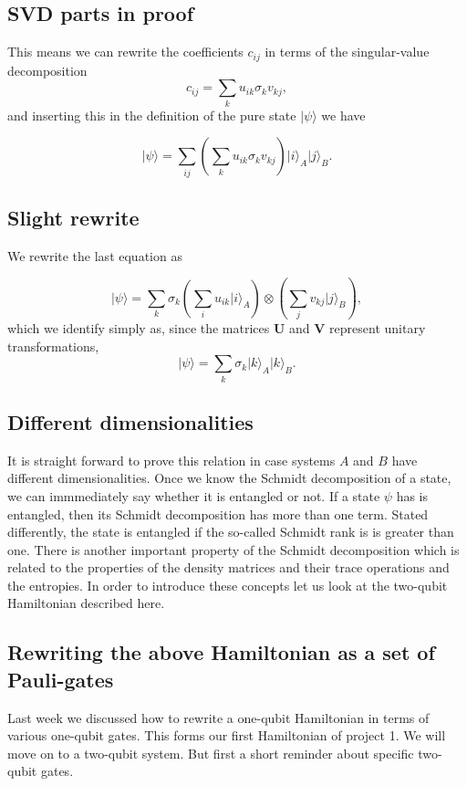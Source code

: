 \documentclass[%
oneside,                 %
final,                   %
10pt]{article}
\begin{document}
\subsection{SVD parts in proof}

This means we can rewrite the coefficients $c_{ij}$ in terms of the singular-value decomposition
\[
c_{ij}=\sum_k u_{ik}\sigma_kv_{kj},
\]
and inserting this in the definition of the pure state $\vert \psi\rangle$ we have

\[
\vert\psi \rangle = \sum_{ij} \left(\sum_k u_{ik}\sigma_kv_{kj} \right)\vert i\rangle_A\vert j\rangle_B.
\]

\subsection{Slight rewrite}
We rewrite the last equation as

\[
\vert\psi \rangle = \sum_{k}\sigma_k \left(\sum_i u_{ik}\vert i\rangle_A\right)\otimes\left(\sum_jv_{kj}\vert j\rangle_B\right),
\]
which we identify simply as, since the matrices $\bm{U}$ and $\bm{V}$ represent unitary transformations,
\[
\vert\psi \rangle = \sum_{k}\sigma_k \vert k\rangle_A\vert k\rangle_B.
\]

\subsection{Different dimensionalities}

It is straight forward to prove this relation in case systems $A$ and
$B$ have different dimensionalities.  Once we know the Schmidt
decomposition of a state, we can immmediately say whether it is
entangled or not. If a state $\psi$ has is entangled, then its Schmidt
decomposition has more than one term. Stated differently, the state is
entangled if the so-called Schmidt rank is is greater than one.  There
is another important property of the Schmidt decomposition which is
related to the properties of the density matrices and their trace
operations and the entropies. In order to introduce these concepts let
us look at the two-qubit Hamiltonian described here.

\subsection{Rewriting the above Hamiltonian as a set of Pauli-gates}

Last week we discussed how to rewrite a one-qubit Hamiltonian in terms
of various one-qubit gates.  This forms our first Hamiltonian of
project 1. We will move on to a two-qubit system.  But first a short
reminder about specific two-qubit gates.
\end{document}
